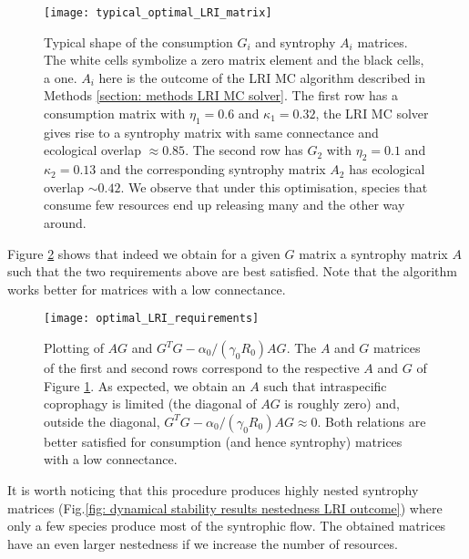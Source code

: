 \documentclass[12pt, titlepage]{report}
\begin{document}
\begin{figure}
\texttt{[image: typical\_optimal\_LRI\_matrix]}
\caption{Typical shape of the consumption $G_i$ and syntrophy $A_i$ matrices. The white cells symbolize a zero matrix element and the black cells, a one. $A_i$ here is the outcome of the LRI MC algorithm described in Methods \ref{section: methods LRI MC solver}. The first row has a consumption matrix with $\eta_1=0.6$ and $\kappa_1=0.32$, the LRI MC solver gives rise to a syntrophy matrix with same connectance and ecological overlap $\approx 0.85$. The second row has $G_2$ with $\eta_2=0.1$ and $\kappa_2=0.13$ and the corresponding syntrophy matrix $A_2$ has ecological overlap $\sim 0.42$. We observe that under this optimisation, species that consume few resources end up releasing many and the other way around.}\label{fig: dynamical stability results typical shape of consumption syntrophy LRI algorithm}
\end{figure}
Figure \ref{fig: dynamical stability optimal LRI requirements met} shows that indeed we obtain for a given $G$ matrix a syntrophy matrix $A$ such that the two requirements above are best satisfied. Note that the algorithm works better for matrices with a low connectance.
\begin{figure}
  \begin{minipage}[c]{0.67\textwidth}
    \texttt{[image: optimal\_LRI\_requirements]}
  \end{minipage}\hfill
  \begin{minipage}[c]{0.3\textwidth}
    \caption{Plotting of $AG$ and $G^TG-\alpha_0/(\gamma_0R_0) AG$. The $A$ and $G$ matrices of the first and second rows correspond to the respective $A$ and $G$ of Figure \ref{fig: dynamical stability results typical shape of consumption syntrophy LRI algorithm}. As expected, we obtain an $A$ such that intraspecific coprophagy is limited (the diagonal of $AG$ is roughly zero) and, outside the diagonal, $G^TG-\alpha_0/(\gamma_0R_0) AG \approx 0$. Both relations are better satisfied for consumption (and hence syntrophy) matrices with a low connectance.}\label{fig: dynamical stability optimal LRI requirements met}
  \end{minipage}
\end{figure}
It is worth noticing that this procedure produces highly nested syntrophy matrices (Fig.\ref{fig: dynamical stability results nestedness LRI outcome}) where only a few species produce most of the syntrophic flow. The obtained matrices have an even larger nestedness if we increase the number of resources.
\end{document}
